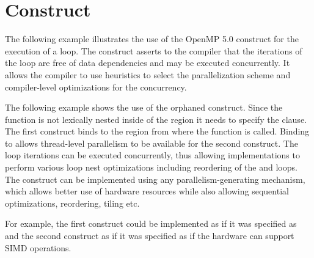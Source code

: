 \section{ Construct}
\label{sec:loop}

The following example illustrates the use of the OpenMP 5.0 
construct for the execution of a loop.
The  construct asserts to the compiler that the iterations 
of the loop are free of data dependencies and may be executed concurrently.
It allows the compiler to use heuristics to select the parallelization scheme
and compiler-level optimizations for the concurrency. 


The following example shows the use of the orphaned  construct. Since the 
function  is not lexically nested inside of the  region it needs to specify 
the  clause. The first  construct binds to the  region 
from where the function  is called. Binding to  allows thread-level 
parallelism to be available for the second  construct.
The loop iterations can be executed concurrently, 
thus allowing implementations to perform various loop nest optimizations including
reordering of the   and  loops. The  construct can be
implemented using any parallelism-generating mechanism, which allows better use
of hardware resources while also allowing sequential optimizations, reordering,
tiling etc.

For example, the first  construct could be implemented as if it was specified as 
 and the second  construct as if it was specified as 
 if the hardware can support SIMD operations.

